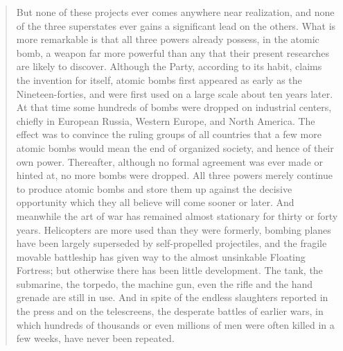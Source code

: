 \begin{quotation}
But none of these projects ever comes anywhere near realization, and
none of the three superstates ever gains a significant lead on the
others. What is more remarkable is that all three powers already
possess, in the atomic bomb, a weapon far more powerful than any that
their present researches are likely to discover. Although the Party,
according to its habit, claims the invention for itself, atomic bombs
first appeared as early as the Nineteen-forties, and were first used on
a large scale about ten years later. At that time some hundreds of bombs
were dropped on industrial centers, chiefly in European Russia, Western
Europe, and North America. The effect was to convince the ruling groups
of all countries that a few more atomic bombs would mean the end of
organized society, and hence of their own power. Thereafter, although no
formal agreement was ever made or hinted at, no more bombs were dropped.
All three powers merely continue to produce atomic bombs and store them
up against the decisive opportunity which they all believe will come
sooner or later. And meanwhile the art of war has remained almost
stationary for thirty or forty years. Helicopters are more used than
they were formerly, bombing planes have been largely superseded by
self-propelled projectiles, and the fragile movable battleship has given
way to the almost unsinkable Floating Fortress; but otherwise there has
been little development. The tank, the submarine, the torpedo, the
machine gun, even the rifle and the hand grenade are still in use. And
in spite of the endless slaughters reported in the press and on the
telescreens, the desperate battles of earlier wars, in which hundreds of
thousands or even millions of men were often killed in a few weeks, have
never been repeated.
\end{quotation}

